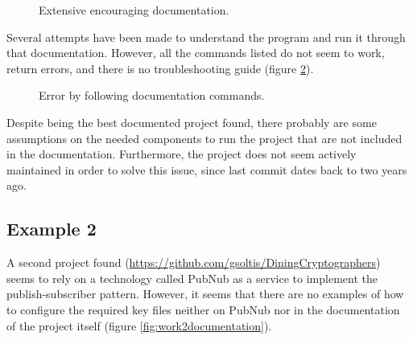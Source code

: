 \begin{figure}[H]
    \centering
    \caption{Extensive encouraging documentation.}
    \label{fig:work1documentation}
\end{figure}

Several attempts have been made to understand the program and run it through that documentation. However, all the commands listed do not seem to work, return errors, and there is no troubleshooting guide (figure \ref{fig:work1error}).


\begin{figure}[H]
    \centering
    \caption{Error by following documentation commands.}
    \label{fig:work1error}
\end{figure}

Despite being the best documented project found, there probably are some assumptions on the needed components to run the project that are not included in the documentation. Furthermore, the project does not seem actively maintained in order to solve this issue, since last commit dates back to two years ago. 

\subsection{Example 2}
A second project found (\url{https://github.com/gsoltis/DiningCryptographers}) seems to rely on a technology called PubNub as a service to implement the publish-subscriber pattern. However, it seems that there are no examples of how to configure the required key files neither on PubNub nor in the documentation of the project itself (figure \ref{fig:work2documentation}).

